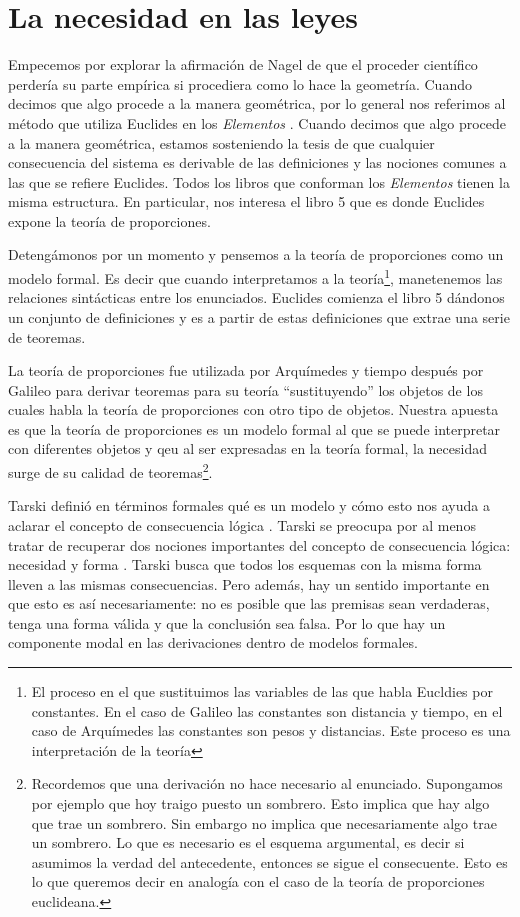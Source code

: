 \section{La necesidad en las leyes}

\noindent Empecemos por explorar la afirmación de Nagel de que el proceder científico perdería su parte empírica si procediera como lo hace la geometría. Cuando decimos que algo procede a la manera geométrica, por lo general nos referimos al método que utiliza Euclides en los \emph{Elementos} \cite{Euclid2008}. Cuando decimos que algo procede a la manera geométrica, estamos sosteniendo la tesis de que cualquier consecuencia del sistema es derivable de las definiciones y las nociones comunes a las que se refiere Euclides. Todos los libros que conforman los \emph{Elementos} tienen la misma estructura. En particular, nos interesa  el libro 5 que es donde Euclides expone la teoría de proporciones.

Detengámonos por un momento y pensemos a la teoría de proporciones como un modelo formal. Es decir que cuando interpretamos a la teoría\footnote{El proceso en el que sustituimos las variables de las que habla Eucldies por constantes. En el caso de Galileo las constantes son distancia y tiempo, en el caso de Arquímedes las constantes son pesos y distancias. Este proceso es una interpretación de la teoría}, manetenemos las relaciones sintácticas entre los enunciados. Euclides comienza el libro 5 dándonos un conjunto de definiciones y es a partir de estas definiciones que extrae una serie de teoremas.

La teoría de proporciones fue utilizada por Arquímedes y tiempo después por Galileo para derivar teoremas para su teoría ``sustituyendo'' los objetos de los cuales habla la teoría de proporciones con otro tipo de objetos. Nuestra apuesta es que la teoría de proporciones es un modelo formal al que se puede interpretar con diferentes objetos y qeu al ser expresadas en la teoría formal, la necesidad surge de su calidad de teoremas\footnote{Recordemos que una derivación no hace necesario al enunciado. Supongamos por ejemplo que hoy traigo puesto un sombrero. Esto implica que hay algo que trae un sombrero. Sin embargo no implica que necesariamente algo trae un sombrero. Lo que es necesario es el esquema argumental, es decir si asumimos la verdad del antecedente, entonces se sigue el consecuente. Esto es lo que queremos decir en analogía con el caso de la teoría de proporciones euclideana.}.

Tarski definió en términos formales qué es un modelo y cómo esto nos ayuda a aclarar el concepto de consecuencia lógica \cite{Tarski1956}. Tarski se preocupa por al menos tratar de recuperar dos nociones importantes del concepto de consecuencia lógica: necesidad y forma \cite{Torrente2000}. Tarski busca que todos los esquemas con la misma forma lleven a las mismas consecuencias. Pero además, hay un sentido importante en que esto es así necesariamente: no es posible que las premisas sean verdaderas, tenga una forma válida y que la conclusión sea falsa. Por lo que hay un componente modal en las derivaciones dentro de modelos formales.

